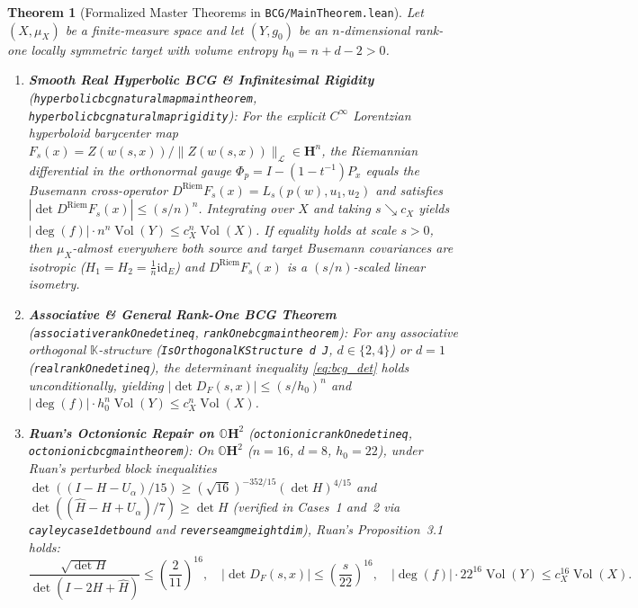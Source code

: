 \documentclass[10pt]{article}
\renewcommand{\_}{\origus\allowbreak}
\newtheorem{theorem}{Theorem}
\newcommand{\Oct}{\mathbb{O}}
\newcommand{\Kfield}{\mathbb{K}}
\newcommand{\Hyp}{\mathbf{H}}
\newcommand{\Vol}{\operatorname{Vol}}
\newcommand{\code}[1]{\texttt{#1}}
\begin{document}
\begin{theorem}[Formalized Master Theorems in \code{BCG/MainTheorem.lean}]\label{thm:main}
Let $(X, \mu_X)$ be a finite-measure space and let $(Y, g_0)$ be an $n$-dimensional rank-one locally
symmetric target with volume entropy $h_0 = n + d - 2 > 0$.
\begin{enumerate}
\item \textbf{Smooth Real Hyperbolic BCG \& Infinitesimal Rigidity} (\code{hyperbolic\_bcg\_natural\_map\_main\_theorem}, \code{hyperbolic\_bcg\_natural\_map\_rigidity}):
For the explicit $C^\infty$ Lorentzian hyperboloid barycenter map $F_s(x) = Z(w(s,x))/\|Z(w(s,x))\|_{\mathcal{L}} \in \Hyp^n$,
the Riemannian differential in the orthonormal gauge $\Phi_p = I - (1 - t^{-1})P_x$ equals the Busemann
cross-operator $D^{\mathrm{Riem}} F_s(x) = L_s(p(w), u_1, u_2)$ and satisfies $|\det D^{\mathrm{Riem}} F_s(x)| \le (s/n)^n$.
Integrating over $X$ and taking $s \searrow c_X$ yields $|\deg(f)|\cdot n^n \Vol(Y) \le c_X^n \Vol(X)$.
If equality holds at scale $s > 0$, then $\mu_X$-almost everywhere both source and target Busemann
covariances are isotropic ($H_1 = H_2 = \frac{1}{n}\mathrm{id}_E$) and $D^{\mathrm{Riem}} F_s(x)$ is a
$(s/n)$-scaled linear isometry.
\item \textbf{Associative \& General Rank-One BCG Theorem} (\code{associative\_rankOne\_det\_ineq}, \code{rankOne\_bcg\_main\_theorem}):
For any associative orthogonal $\Kfield$-structure (\code{IsOrthogonalKStructure d J}, $d \in \{2, 4\}$)
or $d = 1$ (\code{real\_rankOne\_det\_ineq}), the determinant inequality \eqref{eq:bcg_det} holds unconditionally,
yielding $|\det D_F(s,x)| \le (s / h_0)^n$ and $|\deg(f)|\cdot h_0^n \Vol(Y) \le c_X^n \Vol(X)$.
\item \textbf{Ruan's Octonionic Repair on $\Oct\Hyp^2$} (\code{octonionic\_rankOne\_det\_ineq}, \code{octonionic\_bcg\_main\_theorem}):
On $\Oct\Hyp^2$ ($n = 16$, $d = 8$, $h_0 = 22$), under Ruan's perturbed block inequalities
$\det((I - H - U_\alpha)/15) \ge (\sqrt{16})^{-352/15}(\det H)^{4/15}$ and
$\det((\widehat{H} - H + U_\alpha)/7) \ge \det H$ (verified in Cases~1 and~2 via \code{cayley\_case1\_det\_bound}
and \code{reverse\_amgm\_eight\_dim}), Ruan's Proposition~3.1 holds:
$$\frac{\sqrt{\det H}}{\det(I - 2H + \widehat{H})} \le \left(\frac{2}{11}\right)^{16},
\quad |\det D_F(s,x)| \le \left(\frac{s}{22}\right)^{16},
\quad |\deg(f)| \cdot 22^{16} \Vol(Y) \le c_X^{16} \Vol(X).$$
\end{enumerate}
\end{theorem}
\end{document}
